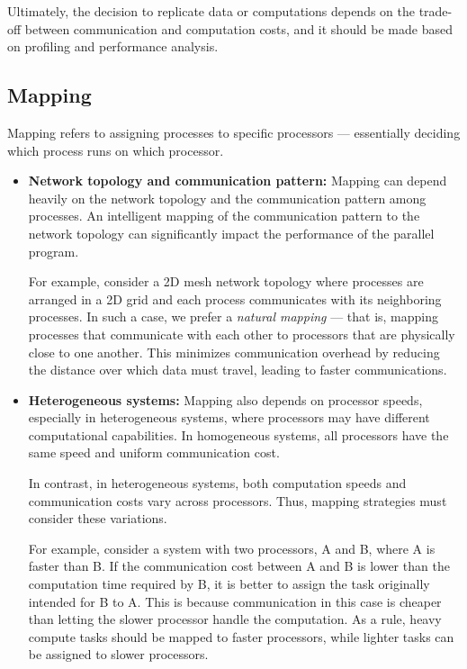 \documentclass[12pt]{book}
\begin{document}
Ultimately, the decision to replicate data or computations depends on the trade-off between communication and computation costs, and it should be made based on profiling and performance analysis.

\subsection{Mapping}

Mapping refers to assigning processes to specific processors — essentially deciding which process runs on which processor.

\begin{itemize}
    \item \textbf{Network topology and communication pattern: } Mapping can depend heavily on the network topology and the communication pattern among processes. An intelligent mapping of the communication pattern to the network topology can significantly impact the performance of the parallel program.

    For example, consider a 2D mesh network topology where processes are arranged in a 2D grid and each process communicates with its neighboring processes. In such a case, we prefer a \textit{natural mapping} — that is, mapping processes that communicate with each other to processors that are physically close to one another. This minimizes communication overhead by reducing the distance over which data must travel, leading to faster communications.

    \item \textbf{Heterogeneous systems: } Mapping also depends on processor speeds, especially in heterogeneous systems, where processors may have different computational capabilities. In homogeneous systems, all processors have the same speed and uniform communication cost.

    In contrast, in heterogeneous systems, both computation speeds and communication costs vary across processors. Thus, mapping strategies must consider these variations. 

    For example, consider a system with two processors, A and B, where A is faster than B. If the communication cost between A and B is lower than the computation time required by B, it is better to assign the task originally intended for B to A. This is because communication in this case is cheaper than letting the slower processor handle the computation. As a rule, heavy compute tasks should be mapped to faster processors, while lighter tasks can be assigned to slower processors.
\end{itemize}
\end{document}
